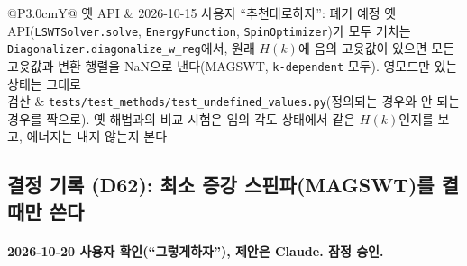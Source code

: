 \begin{tabularx}{\textwidth}{@{}P{3.0cm}Y@{}}
    옛 API & 2026-10-15 사용자 ``추천대로하자'': 폐기 예정 옛 API(\texttt{LSWTSolver.solve}, \texttt{EnergyFunction}, \texttt{SpinOptimizer})가 모두 거치는 \texttt{Diagonalizer.diagonalize\_w\_reg}에서, 원래 $H(k)$에 음의 고윳값이 있으면 모든 고윳값과 변환 행렬을 NaN으로 낸다(MAGSWT, \texttt{k-dependent} 모두). 영모드만 있는 상태는 그대로 \\
    검산 & \texttt{tests/test\_methods/test\_undefined\_values.py}(정의되는 경우와 안 되는 경우를 짝으로). 옛 해법과의 비교 시험은 임의 각도 상태에서 같은 $H(k)$인지를 보고, 에너지는 내지 않는지 본다 \\
    \bottomrule
  \end{tabularx}
\endgroup

\subsection{결정 기록 (D62): 최소 증강 스핀파(MAGSWT)를 켤 때만 쓴다}\label{decisions-d62-magswt}
\begingroup%
  \framesubtitle{2026-10-20 사용자 확인(``그렇게하자''), 제안은 Claude. 잠정 승인.}
  \small\renewcommand{\arraystretch}{1.12}
